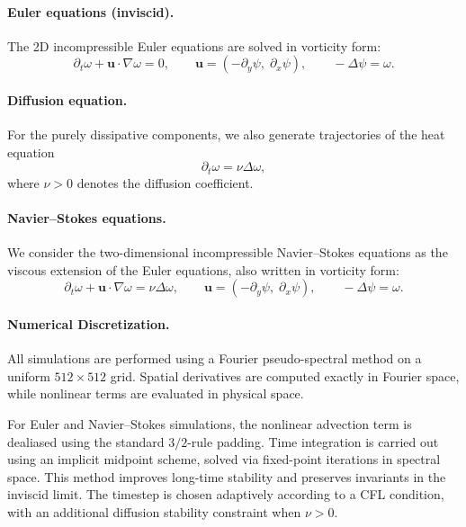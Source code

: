 \documentclass{article}
\theoremstyle{plain}
\theoremstyle{definition}
\theoremstyle{remark}
\begin{document}
\paragraph{Euler equations (inviscid).}
The 2D incompressible Euler equations are solved in vorticity form:
\begin{equation}
\partial_t \omega + \mathbf{u}\cdot\nabla \omega = 0,
\qquad
\mathbf{u} = (-\partial_y \psi,\; \partial_x \psi),
\qquad
-\Delta \psi = \omega .
\end{equation}

\paragraph{Diffusion equation.}
For the purely dissipative components, we also generate trajectories of the heat
equation
\begin{equation}
\partial_t \omega = \nu \Delta \omega ,
\end{equation}
where \(\nu > 0\) denotes the diffusion coefficient.

\paragraph{Navier--Stokes equations.}
We consider the two-dimensional incompressible Navier--Stokes equations as the
viscous extension of the Euler equations, also written in vorticity form:
\begin{equation}
\partial_t \omega + \mathbf{u}\cdot\nabla \omega = \nu \Delta \omega ,
\qquad
\mathbf{u} = (-\partial_y \psi,\; \partial_x \psi),
\qquad
-\Delta \psi = \omega .
\end{equation}

\paragraph{Numerical Discretization.}
All simulations are performed using a Fourier pseudo-spectral method on a
uniform \(512 \times 512\) grid. Spatial derivatives are computed exactly in
Fourier space, while nonlinear terms are evaluated in physical space.

For Euler and Navier--Stokes simulations, the nonlinear advection term is
dealiased using the standard \(3/2\)-rule padding. Time integration is carried
out using an implicit midpoint scheme, solved via fixed-point iterations in
spectral space. This method improves long-time stability and preserves
invariants in the inviscid limit. The timestep is chosen adaptively according to
a CFL condition, with an additional diffusion stability constraint when
\(\nu>0\).
\end{document}
